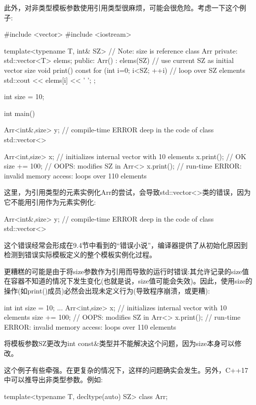 此外，对非类型模板参数使用引用类型很麻烦，可能会很危险。考虑一下这个例子:

\begin{cpp}
#include <vector>
#include <iostream>

template<typename T, int& SZ> // Note: size is reference
class Arr {
private:
	std::vector<T> elems;
public:
	Arr() : elems(SZ) { // use current SZ as initial vector size
	}
	void print() const {
		for (int i=0; i<SZ; ++i) { // loop over SZ elements
			std::cout << elems[i] << ’ ’;
		}
	}
};

int size = 10;

int main()
{
	Arr<int&,size> y; // compile-time ERROR deep in the code of class std::vector<>

	Arr<int,size> x; // initializes internal vector with 10 elements
	x.print(); // OK
	size += 100; // OOPS: modifies SZ in Arr<>
	x.print(); // run-time ERROR: invalid memory access: loops over 110 elements
}
\end{cpp}

这里，为引用类型的元素实例化Arr的尝试，会导致std::vector<>类的错误，因为它不能用引用作为元素实例化:

\begin{cpp}
Arr<int&,size> y; // compile-time ERROR deep in the code of class std::vector<>
\end{cpp}

这个错误经常会形成在9.4节中看到的“错误小说”，编译器提供了从初始化原因到检测到错误实际模板定义的整个模板实例化过程。

更糟糕的可能是由于将size参数作为引用而导致的运行时错误:其允许记录的size值在容器不知道的情况下发生变化(也就是说，size值可能会失效)。因此，使用size的操作(如print()成员)必然会出现未定义行为(导致程序崩溃，或更糟):

\begin{cpp}
int int size = 10;
...
Arr<int,size> x; // initializes internal vector with 10 elements
size += 100; // OOPS: modifies SZ in Arr<>
x.print(); // run-time ERROR: invalid memory access: loops over 110 elements
\end{cpp}

将模板参数SZ更改为int const\&类型并不能解决这个问题，因为size本身可以修改。

这个例子有些牵强。在更复杂的情况下，这样的问题确实会发生。另外，C++17中可以推导出非类型参数。例如:

\begin{cpp}
template<typename T, decltype(auto) SZ>
class Arr;
\end{cpp}

